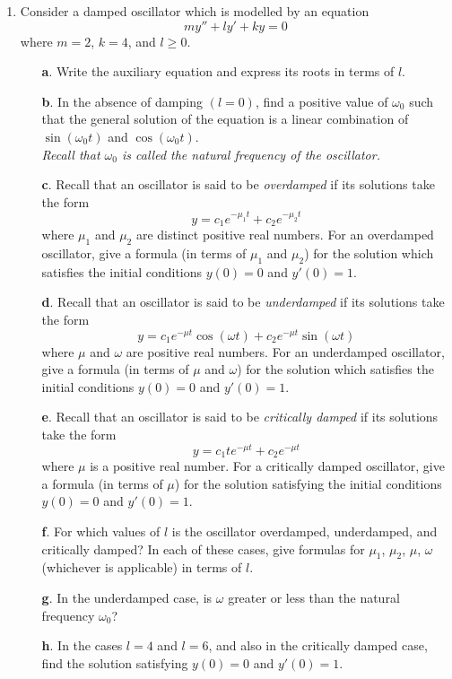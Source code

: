 \documentclass[10pt,psamsfonts,reqno,oneside,letterpaper]{amsart}
\begin{document}
\begin{enumerate}[I]
\item Consider a damped oscillator which is modelled by an equation
	\[ my'' + ly' + ky = 0 \] 
	where $m = 2$, $k = 4$, and $l \geq 0$.
	\begin{enumerate}
		\item[\textbf{a}.] Write the auxiliary equation and express its roots in terms of $l$.
		\item[\textbf{b}.] In the absence of damping $(l = 0)$, find a positive value of $\omega_0$ such that the general solution of the equation is a linear combination of $\sin(\omega_0 t)$ and $\cos(\omega_0 t)$. \\
		\textit{Recall that $\omega_0$ is called the \emph{natural frequency} of the oscillator.}
		\item[\textbf{c}.] Recall that an oscillator is said to be \emph{overdamped} if its solutions take the form 
		\[ y = c_1 e^{-\mu_1 t} + c_2 e^{-\mu_2 t} \]
		where $\mu_1$ and $\mu_2$ are distinct positive real numbers.  For an overdamped oscillator, give a formula (in terms of $\mu_1$ and $\mu_2$) for the solution which satisfies the initial conditions $y(0) = 0$ and $y'(0) = 1$. 
		\item[\textbf{d}.] Recall that an oscillator is said to be \emph{underdamped} if its solutions take the form 
		\[ y = c_1 e^{-\mu t} \cos(\omega t) + c_2 e^{-\mu t} \sin(\omega t) \]
		where $\mu$ and $\omega$ are positive real numbers.  For an underdamped oscillator, give a formula (in terms of $\mu$ and $\omega$) for the solution which satisfies the initial conditions $y(0) = 0$ and $y'(0) = 1$. 
		\item[\textbf{e}.] Recall that an oscillator is said to be \emph{critically damped} if its solutions take the form
		\[ y = c_1 t e^{-\mu t} + c_2 e^{-\mu t} \]
		where $\mu$ is a positive real number.  For a critically damped oscillator, give a formula (in terms of $\mu$) for the solution satisfying the initial conditions $y(0) = 0$ and $y'(0) = 1$. 
		\item[\textbf{f}.] For which values of $l$ is the oscillator overdamped, underdamped, and critically damped?  In each of these cases, give formulas for $\mu_1$, $\mu_2$, $\mu$, $\omega$ (whichever is applicable) in terms of $l$. 
		\item[\textbf{g}.] In the underdamped case, is $\omega$ greater or less than the natural frequency $\omega_0$?
		\item[\textbf{h}.] In the cases $l = 4$ and $l =6$, and also in the critically damped case, find the solution satisfying $y(0) = 0$ and $y'(0) = 1$.

\end{enumerate}
\end{enumerate}
\end{document}
